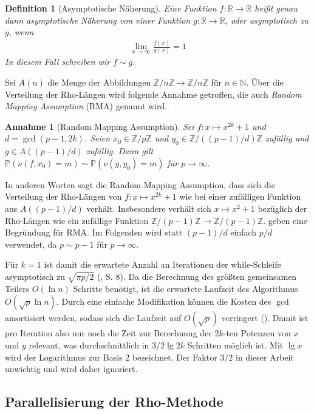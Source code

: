\documentclass[a4paper, 10pt, ngerman]{article}
\newcommand{\N}{\mathbb{N}}
\newcommand{\R}{\mathbb{R}}
\newcommand{\Z}{\mathbb{Z}}
\renewcommand{\P}{\mathbb{P}}
\newtheorem{definition}{Definition}
\newtheorem*{assumption*}{Annahme}
\begin{document}
\begin{definition}[Asymptotische Näherung]
    Eine Funktion $f : \R \to \R$ heißt genau dann asymptotische Näherung von einer Funktion $g : \R \to \R$, oder asymptotisch zu $g$, wenn
    \begin{align*}
        \lim_{x \to \infty} \frac {f(x)} {g(x)} = 1
    \end{align*}
    In diesem Fall schreiben wir $f \sim g$.
\end{definition}

Sei $A(n)$ die Menge der Abbildungen $\Z/n\Z \to \Z/n\Z$ für $n \in \N$. Über die Verteilung der Rho-Längen wird folgende Annahme getroffen, die auch \emph{Random Mapping Assumption} (RMA) genannt wird.

\begin{assumption*}[Random Mapping Assumption]
    Sei $f : x \mapsto x^{2k} + 1$ und $d = \gcd(p - 1, 2k)$. Seien $x_0 \in \Z/p\Z$ und $y_0 \in \Z/((p - 1)/d)\Z$ zufällig und $g \in A((p - 1)/d)$ zufällig. Dann gilt $\P(\nu(f, x_0) = m) \sim \P(\nu(g, y_0) = m)$ für $p \to \infty$.
\end{assumption*}

\noindent In anderen Worten sagt die Random Mapping Assumption, dass sich die Verteilung der Rho-Längen von $f : x \mapsto x^{2k} + 1$ wie bei einer zufälligen Funktion aus $A((p - 1)/d)$ verhält. Insbesondere verhält sich $x \mapsto x^2 + 1$ bezüglich der Rho-Längen wie ein zufällige Funktion $\Z/(p - 1)\Z \to \Z/(p - 1)\Z$. \cite{bp81} geben eine Begründung für RMA. Im Folgenden wird statt $(p - 1)/d$ einfach $p/d$ verwendet, da $p \sim p - 1$ für $p \to \infty$.

Für $k = 1$ ist damit die erwartete Anzahl an Iterationen der while-Schleife asymptotisch zu $\sqrt{\pi p / 2}$ (\cite{knu98}, S. 8). Da die Berechnung des größten gemeinsamen Teilers $O(\ln n)$ Schritte benötigt, ist die erwartete Laufzeit des Algorithmus $O(\sqrt p \ln n)$. Durch eine einfache Modifikation können die Kosten des $\gcd$ amortisiert werden, sodass sich die Laufzeit auf $O(\sqrt p)$ verringert (\cite{bre80}). Damit ist pro Iteration also nur noch die Zeit zur Berechnung der $2k$-ten Potenzen von $x$ und $y$ relevant, was durchschnittlich in $3/2 \lg 2k$ Schritten möglich ist. Mit $\lg x$ wird der Logarithmus zur Basis 2 bezeichnet. Der Faktor $3/2$ in dieser Arbeit unwichtig und wird daher ignoriert.

\subsection{Parallelisierung der Rho-Methode}
\end{document}
